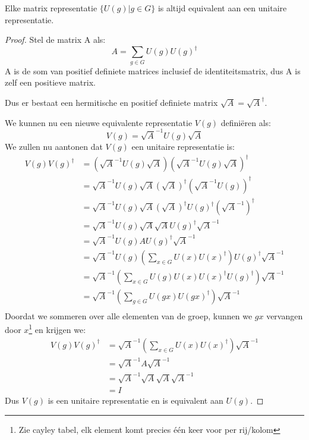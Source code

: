 \begin{theorem}
    Elke matrix representatie \(\{U(g)|g\in G\}\) is altijd equivalent aan een unitaire representatie.
\end{theorem}
\begin{proof}
    Stel de matrix A als:
    \[A = \sum_{g\in G} U(g) U(g)^{\dagger}\]
    A is de som van positief definiete matrices inclusief de identiteitsmatrix,
    dus A is zelf een positieve matrix.

    Dus er bestaat een hermitische en positief definiete matrix \(\sqrt{A} = \sqrt{A}^\dagger\).

    We kunnen nu een nieuwe equivalente representatie \(V(g)\) definiëren als: 
    \[
    V(g) = \sqrt{A}^{-1} U(g) \sqrt{A}
    \]  
    We zullen nu aantonen dat \(V(g)\) een unitaire representatie is:
    \begin{align*}
    V(g)V(g)^{\dagger} &= \left(\sqrt{A}^{-1} U(g) \sqrt{A}\right) \left(\sqrt{A}^{-1} U(g) \sqrt{A}\right)^{\dagger} \\
    &= \sqrt{A}^{-1} U(g) \sqrt{A} \left(\sqrt{A}\right)^{\dagger} \left(\sqrt{A}^{-1} U(g)\right)^{\dagger} \\
    &= \sqrt{A}^{-1} U(g) \sqrt{A}  \left(\sqrt{A}\right)^{\dagger} U(g)^{\dagger} \left(\sqrt{A}^{-1}\right)^{\dagger} \\
    &= \sqrt{A}^{-1} U(g) \sqrt{A}  \sqrt{A}  U(g)^{\dagger}  \sqrt{A}^{-1} \\
    &= \sqrt{A}^{-1} U(g) A U(g)^{\dagger} \sqrt{A}^{-1} \\
    &= \sqrt{A}^{-1} U(g) \left(\sum_{x\in G} U(x) U(x)^{\dagger}\right) U(g)^{\dagger} \sqrt{A}^{-1} \\
    &= \sqrt{A}^{-1} \left(\sum_{x\in G} U(g)U(x)U(x)^{\dagger} U(g)^{\dagger}\right) \sqrt{A}^{-1} \\
    &= \sqrt{A}^{-1} \left(\sum_{g\in G} U(gx) U(gx)^{\dagger}\right) \sqrt{A}^{-1} \\
    \end{align*}
    Doordat we sommeren over alle elementen van de groep, kunnen we \(gx\) vervangen door \(x\)\footnote{Zie cayley tabel, elk element komt precies één keer voor per rij/kolom} en krijgen we:
    \begin{align*}
    V(g)V(g)^{\dagger} &= \sqrt{A}^{-1} \left(\sum_{x\in G} U(x) U(x)^{\dagger}\right) \sqrt{A}^{-1} \\
    &= \sqrt{A}^{-1} A \sqrt{A}^{-1} \\
    &= \sqrt{A}^{-1} \sqrt{A}\sqrt{A} \sqrt{A}^{-1} \\
    &= I
    \end{align*}
    Dus \(V(g)\) is een unitaire representatie en is equivalent aan \(U(g)\).
\end{proof}